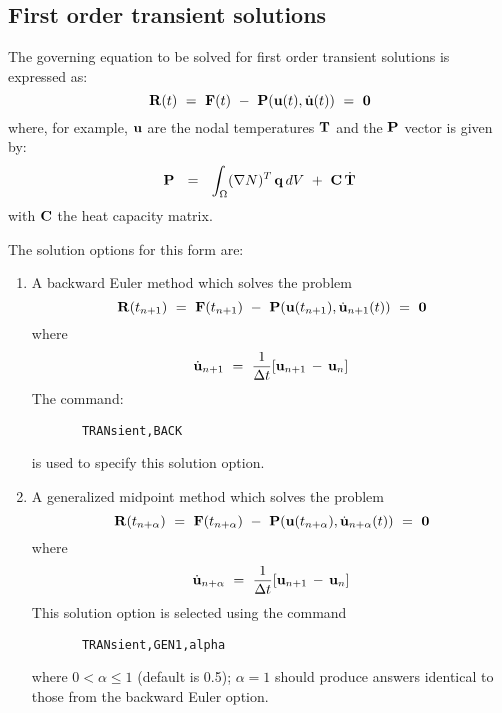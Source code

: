 \subsection{First order transient solutions}
\label{trans1}

The governing equation to be solved for first order transient solutions
is expressed as:
\begin{equation}
\mathbf{R} (t) ~=~ \mathbf{F}(t) ~-~ \mathbf{P}( \mathbf{u}(t) , \dot{\mathbf{u}} (t) ) ~=~ {\bf 0}
\end{equation}
where, for example, $\mathbf{u}$ are the nodal temperatures $\mathbf{T}$ and the $\mathbf{P}$
vector is given by:
\begin{equation}
\mathbf{P}~~=~~ \int_{\Omega} (\nabla N)^T \, \mathbf{q} \, dV
~+~ \mathbf{C} \, \dot{\mathbf{T}}
\end{equation}
with $\mathbf{C}$ the heat capacity matrix.

The solution options for this form are:

\begin{enumerate}
\item
{A backward Euler method which solves the problem
\begin{equation}
\mathbf{R} (t_{n+1})
~=~ \mathbf{F}(t_{n+1}) ~-~ \mathbf{P}( \mathbf{u}(t_{n+1}) , \dot{\mathbf{u}}_{n+1} (t) )
~=~ {\bf 0}
\end{equation}
where
\begin{equation}
\dot{\mathbf{u}}_{n+1} ~=~ \frac{1}{\Delta t} [ \mathbf{u}_{n+1} \,-\, \mathbf{u}_n ]
\end{equation}
The command:
\begin{verbatim}
       TRANsient,BACK
\end{verbatim}
is used to specify this solution option.}

\item
{A generalized midpoint method which solves the problem
\begin{equation}
\mathbf{R} (t_{n+\alpha}) ~=~ \mathbf{F}(t_{n+\alpha})
~-~ \mathbf{P}( \mathbf{u}(t_{n+\alpha}) , \dot{\mathbf{u}}_{n+\alpha} (t) ) ~=~ {\bf 0}
\end{equation}
where
\begin{equation}
\dot{\mathbf{u}}_{n+\alpha} ~=~ \frac{1}{\Delta t} [ \mathbf{u}_{n+1} \,-\, \mathbf{u}_n ]
\end{equation}
This solution option is selected using the command
\begin{verbatim}
       TRANsient,GEN1,alpha
\end{verbatim}
where $0 < \alpha \le 1$ (default is 0.5); $\alpha = 1$ should produce answers
identical to those from the backward Euler option.}
\end{enumerate}

